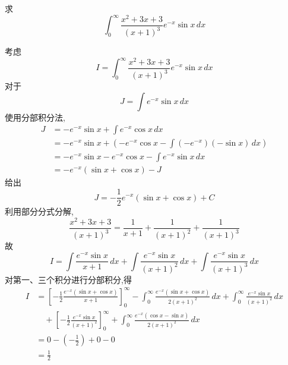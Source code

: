 \begin{questions}
    \question
    求
    \[
    \int_{0}^{\infty} \frac{x^2+3x+3}{(x+1)^3} e^{-x} \sin x \, dx
    \]
    \begin{solution}
        考虑
        \[
        I=\int_{0}^{\infty} \frac{x^2+3x+3}{(x+1)^3} e^{-x} \sin x \, dx
        \]
        对于
        \[
        J = \int e^{-x} \sin x \, dx 
        \]
        使用分部积分法,
        \begin{align*}
        J &= -e^{-x} \sin x + \int e^{-x} \cos x \, dx \\
        &= -e^{-x} \sin x + \left( -e^{-x} \cos x - \int (-e^{-x}) (-\sin x) \, dx \right) \\
        &= -e^{-x} \sin x - e^{-x} \cos x - \int e^{-x} \sin x \, dx \\
        &= -e^{-x} (\sin x + \cos x) - J 
        \end{align*}
        给出
        \[
        J=-\frac{1}{2} e^{-x} (\sin x + \cos x) + C
        \]
        利用部分分式分解,
        \[
        \frac{x^2+3x+3}{(x+1)^3} = \frac{1}{x+1} + \frac{1}{(x+1)^2} + \frac{1}{(x+1)^3}
        \]
        故
        \[
        I=\int\frac{e^{-x} \sin x}{x+1}\, dx  + \int\frac{e^{-x} \sin x}{(x+1)^2}\, dx  + \int\frac{e^{-x} \sin x}{(x+1)^3}\, dx 
        \]
        对第一、三个积分进行分部积分,得
        \begin{align*}
        I &= \left[ -\frac{1}{2} \frac{e^{-x}(\sin x + \cos x)}{x+1} \right]_{0}^{\infty} - \int_{0}^{\infty} \frac{e^{-x}(\sin x + \cos x)}{2(x+1)^2} \, dx + \int_{0}^{\infty} \frac{e^{-x} \sin x}{(x+1)^2} \, dx \\
        &\quad + \left[ -\frac{1}{2} \frac{e^{-x} \sin x}{(x+1)^2} \right]_{0}^{\infty} + \int_{0}^{\infty} \frac{e^{-x}(\cos x - \sin x)}{2(x+1)^2} \, dx \\
        &=  0 - \left( -\frac{1}{2} \right) +  0 - 0  \\
        &= \frac{1}{2}
        \end{align*}
    \end{solution}


\end{questions}
